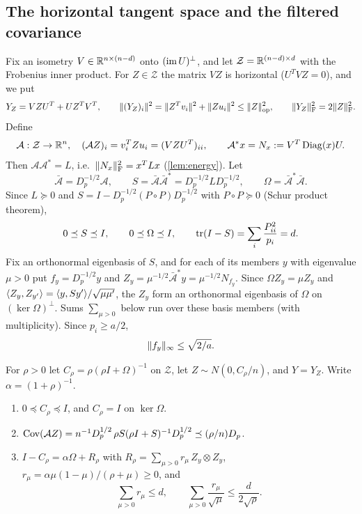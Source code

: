 \subsection{The horizontal tangent space and the filtered covariance}

Fix an isometry $V\in\mathbb R^{n\times(n-d)}$ onto $(\operatorname{im} U)^\perp$, and let
$\mathcal Z=\mathbb R^{(n-d)\times d}$ with the Frobenius inner product. For
$Z\in\mathcal Z$ the matrix $VZ$ is horizontal ($U^TVZ=0$), and we put
\[
 Y_Z=VZU^T+UZ^TV^T,\qquad \lVert (Y_Z)_i\rVert^2=\lVert Z^Tv_i\rVert^2+\lVert Zu_i\rVert^2\le\lVert Z\rVert_{\mathrm{op}}^2,
 \qquad \lVert Y_Z\rVert_{\mathrm F}^2=2\lVert Z\rVert_{\mathrm F}^2 .
\]
Define
\[
 \mathcal A:\mathcal Z\to\mathbb R^n,\quad (\mathcal AZ)_i=v_i^TZu_i=(VZU^T)_{ii},\qquad
 \mathcal A^*x=N_x:=V^T\operatorname{Diag}(x)U .
\]
Then $\mathcal A\mathcal A^*=L$, i.e.\ $\lVert N_x\rVert_{\mathrm F}^2=x^TLx$ (\cref{lem:energy}). Let
\[
 \bar{\mathcal A}=D_p^{-1/2}\mathcal A,\qquad
 S=\bar{\mathcal A}\bar{\mathcal A}^*=D_p^{-1/2}LD_p^{-1/2},\qquad
 \Omega=\bar{\mathcal A}^*\bar{\mathcal A} .
\]
Since $L\succeq0$ and $S=I-D_p^{-1/2}(P\circ P)D_p^{-1/2}$ with $P\circ P\succeq0$
(Schur product theorem),
\begin{equation}\label{eq:S}
 0\preceq S\preceq I,\qquad 0\preceq \Omega\preceq I,\qquad
 \operatorname{tr}(I-S)=\sum_i\frac{P_{ii}^2}{p_i}=d .
\end{equation}
Fix an orthonormal eigenbasis of $S$, and for each of its members $y$ with
eigenvalue $\mu>0$ put $f_y=D_p^{-1/2}y$ and
$Z_y=\mu^{-1/2}\bar{\mathcal A}^*y=\mu^{-1/2}N_{f_y}$. Since $\Omega Z_y=\mu Z_y$ and
$\langle Z_y,Z_{y'}\rangle=\langle y,Sy'\rangle/\sqrt{\mu\mu'}$, the $Z_y$ form an orthonormal
eigenbasis of $\Omega$ on $(\ker \Omega)^\perp$. Sums $\sum_{\mu>0}$ below run over these
basis members (with multiplicity). Since $p_i\ge a/2$,
\begin{equation}\label{eq:finfty}
 \lVert f_y\rVert_\infty\le\sqrt{2/a}.
\end{equation}

\begin{definition}
For $\rho>0$ let $C_\rho=\rho(\rho I+\Omega)^{-1}$ on $\mathcal Z$, let
$Z\sim N(0,C_\rho/n)$, and $Y=Y_Z$. Write $\alpha=(1+\rho)^{-1}$.
\end{definition}

\begin{lemma}\label{lem:filter}
\begin{enumerate}[label=(\alph*)]
\item $0\preceq C_\rho\preceq I$, and $C_\rho=I$ on $\ker \Omega$.
\item $\operatorname{Cov}(\mathcal AZ)=n^{-1}D_p^{1/2}\,\rho S(\rho I+S)^{-1}D_p^{1/2}\preceq
(\rho/n)D_p$.
\item $I-C_\rho=\alpha\Omega+R_\rho$ with $R_\rho=\sum_{\mu>0}r_\mu\,Z_y\otimes Z_y$,
$r_\mu=\alpha\mu(1-\mu)/(\rho+\mu)\ge0$, and
\[
 \sum_{\mu>0}r_\mu\le d,\qquad
 \sum_{\mu>0}\frac{r_\mu}{\sqrt\mu}\le\frac d{2\sqrt\rho}.
\]
\end{enumerate}
\end{lemma}


